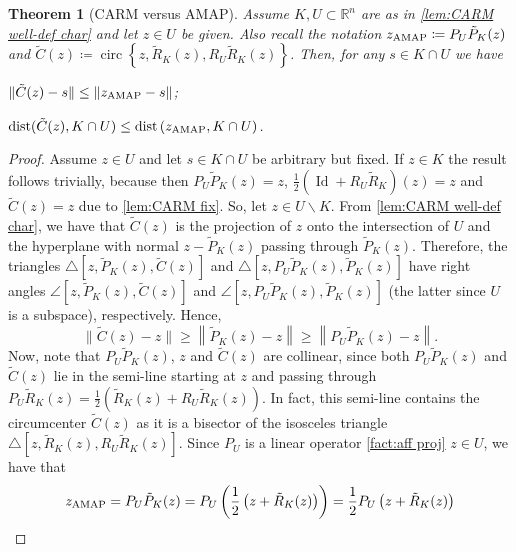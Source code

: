 \documentclass[smallextended,numbook,nospthms]{svjour3}
\theoremstyle{plain}
\newtheorem{theorem}{Theorem}[section]
\theoremstyle{definition}
\def\RR{\mathds R}
\DeclareMathOperator{\Id}{Id}
\DeclareMathOperator{\dist}{dist}
\DeclareMathOperator{\circum}{circ}
\newcommand{\AMAP}{{\rm AMAP}}
\begin{document}
\begin{theorem}[CARM versus AMAP]\label{thm:CARM x AMAP} Assume $K, U \subset \RR^{n}$ are as in  \cref{lem:CARM well-def char} and let $z \in U$ be given. Also recall the notation $z_{\mathrm{\AMAP}}\coloneqq P_{U}\tilde{P}_{K}(z)$ and $\tilde{C}(z)\coloneqq \circum \left\{z, \tilde{R}_{K}(z), R_{U} \tilde{R}_{K}(z)\right\}$.
	Then, for any $s \in K \cap U$ we have
	\begin{listi}
		\item $\|\tilde{C}(z)-s\| \leq\left\|z_{\AMAP}-s\right\|$;
		\item $\dist(\tilde{C}(z), K \cap U) \leq \dist\left(z_{\mathrm{\AMAP}}, K \cap U\right)$.
	\end{listi}
\end{theorem}
\begin{proof}
	Assume $z \in U$ and let $s \in K \cap U$ be arbitrary but fixed. If $z \in K$ the result follows trivially, because then $P_{U} \tilde{P}_{K}(z)=z$, $\frac{1}{2}\left(\Id+R_{U} \tilde{R}_{K}\right)(z)=z$ and $\tilde{C}(z)=z$ due to  \cref{lem:CARM fix}. So, let $z \in U \backslash K$. From  \cref{lem:CARM well-def char}, we have that $\tilde{C}(z)$ is the projection of $z$ onto the intersection of $U$ and the hyperplane with normal $z-\tilde{P}_{K}(z)$ passing through $\tilde{P}_{K}(z)$. Therefore, the triangles $\triangle{[z, \tilde{P}_{K}(z), \tilde{C}(z)]}$ and $\triangle{[z, P_{U}\tilde{P}_{K}(z), \tilde{P}_{K}(z)]}$ have right angles $\angle{[z, \tilde{P}_{K}(z), \tilde{C}(z)]}$ and $\angle{[z,P_{U}\tilde{P}_{K}(z), \tilde{P}_{K}(z)]}$ (the latter since $U$ is a subspace), respectively. Hence,
	\begin{equation}\label{eq:myopic 1}
		\|\tilde{C}(z)-z\| \geq\left\|\tilde{P}_{K}(z)-z\right\| \geq\left\|P_{U}\tilde{P}_{K}(z)-z\right\|.	\end{equation}
	Now, note that $P_{U}\tilde{P}_{K}(z)$, $z$ and $\tilde{C}(z)$ are collinear, since both $P_{U} \tilde{P}_{K}(z)$ and $\tilde{C}(z)$ lie in the semi-line starting at $z$ and passing through $P_{U}\tilde{R}_{K}(z)=\frac{1}{2}\left(\tilde{R}_{K}(z)+R_{U}\tilde{R}_{K}(z)\right)$. In fact, this semi-line contains the circumcenter $\tilde{C}(z)$ as it is a bisector of the isosceles triangle $\triangle{[z, \tilde{R}_{K}(z),R_{U}\tilde{R}_{K}(z)]}$. Since $P_{U}$ is a linear operator \cref{fact:aff proj} $z \in U$, we have that
	\begin{align}
		z_{\mathrm{\AMAP}} &=P_{U} \tilde{P}_{K}(z)=P_{U}\left(\frac{1}{2}\left(z+\tilde{R}_{K}(z)\right)\right)=\frac{1}{2} P_{U}\left(z+\tilde{R}_{K}(z)\right) \\

\end{align}
\end{proof}
\end{document}
